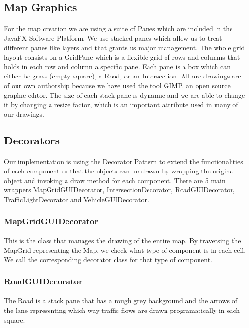 \documentclass[a4paper,11pt,titlepage]{article}
\begin{document}
\subsection{Map Graphics}
\paragraph{}
For the map creation we are using a suite of Panes which are included in the JavaFX Software Platform. We use stacked panes which allow us to treat different panes like layers and that grants us major management. The whole grid layout consists on a GridPane which is a flexible grid of rows and columns that holds in each row and column a specific pane. Each pane is a box which can either be grass (empty square), a Road, or an Intersection. All are drawings are of our own authorship because we have used the tool GIMP, an open source graphic editor. The size of each stack pane is dynamic and we are able to change it by changing a resize factor, which is an important attribute used in many of our drawings. 
\subsection{Decorators}
\paragraph{}
Our implementation is using the Decorator Pattern to extend the functionalities of each component so that the objects can be drawn by wrapping the original object and invoking a draw method for each component. There are 5 main wrappers MapGridGUIDecorator, IntersectionDecorator, RoadGUIDecorator, TrafficLightDecorator and VehicleGUIDecorator.
\subsubsection{MapGridGUIDecorator}
\paragraph{}
This is the class that manages the drawing of the entire map. By traversing the MapGrid representing the Map, we check what type of component is in each cell. We call the corresponding decorator class for that type of component. 
\subsubsection{RoadGUIDecorator}
\paragraph{}
The Road is a stack pane that has a rough grey background and the arrows of the lane representing which way traffic flows are drawn programatically in each square.
\end{document}

